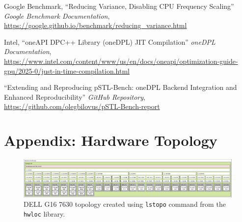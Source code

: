 \documentclass[sigconf]{acmart}
\begin{document}
\begin{thebibliography}{1}
      Google Benchmark, ``Reducing Variance, Disabling CPU Frequency Scaling'' \textit{Google Benchmark Documentation},
      \url{https://google.github.io/benchmark/reducing_variance.html}

      Intel, ``oneAPI DPC++ Library (oneDPL) JIT Compilation'' \textit{oneDPL Documentation},
      \url{https://www.intel.com/content/www/us/en/docs/oneapi/optimization-guide-gpu/2025-0/just-in-time-compilation.html}

      ``Extending and Reproducing pSTL-Bench: oneDPL Backend Integration and Enhanced Reproducibility'' \textit{GitHub Repository},
      \url{https://github.com/olegbilovus/pSTL-Bench-report}

\end{thebibliography}

\newpage
\onecolumn
\section*{Appendix: Hardware Topology}
\begin{figure}[H]
      \centering
      \includegraphics[width=\textwidth]{figures/topology}
      \caption{DELL G16 7630 topology created using \texttt{lstopo} command from the \texttt{hwloc} library.}\label{fig:topology}
\end{figure}
\end{document}
